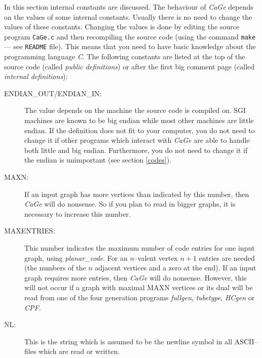 \documentclass[a4paper]{article}
\def\CaGe{\textit{CaGe}}
\begin{document}
In this section internal constants are discussed. The behaviour of \CaGe{}
depends on the values of some internal constants. Usually there is no need to
change the values of these constants. Changing the values is done by editing
the source program \texttt{CaGe.c} and then recompiling the source code
(using the command \texttt{make} --- see \texttt{README} file). 
This means that you
need to have basic knowledge about the programming language \textit{C}. 
The following constants are listed at the top of the source code (called
\textit{public definitions}) or after
the first big comment page (called \textit{internal definitions}):
\begin{description}
\item[ENDIAN\_OUT/ENDIAN\_IN:] The value depends on the machine the 
source code is compiled on. SGI machines are known to be big endian while most
other machines are little endian. If the definition does not fit to your
computer, you do not need to change it if other programs which interact with
\CaGe{} are able to handle both little and big endian. Furthermore, you do
not need to change it if the endian is unimportant (see section \ref{codes}).
\item[MAXN:] If an input graph has more vertices than indicated by this number,
then \CaGe{} will do nonsense. So if you plan to read in bigger graphs, it is
necessary to increase this number.
\item[MAXENTRIES:] This number indicates the maximum number of code entries
for one input graph, using \textit{planar\_code}. For an $n$--valent vertex 
$n+1$ entries are needed (the numbers of the $n$ adjacent vertices and a zero
at the end). If an input graph requires more entries, then \CaGe{} will do
nonsense. However, this will not occur if a graph with maximal MAXN vertices
or its dual will be read from one of the four generation programs 
\textit{fullgen}, \textit{tubetype}, \textit{HCgen} or \textit{CPF}.
\item[NL:] This is the string which is assumed to be the newline symbol in
all ASCII--files which are read or written.
\end{description}
\end{document}
